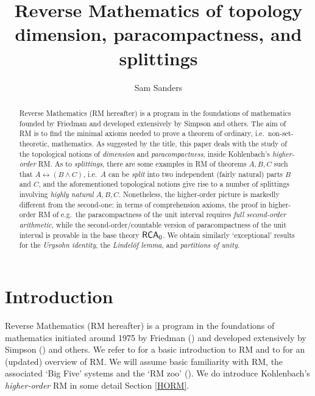 \documentclass[reqno]{amsart}
\def\RCA{\textup{\textsf{RCA}}}
\def\asa{\leftrightarrow}
\numberwithin{equation}{section}
\numberwithin{thm}{section}
\begin{document}
\title[Reverse Mathematics of topology]{Reverse Mathematics of topology \\ {\tiny dimension, paracompactness, and splittings}}
\author{Sam Sanders}
\address{Centre for Advanced Studies, LMU Munich \& Department of Mathematics, TU Darmstadt, Germany}

\begin{abstract}
Reverse Mathematics (RM hereafter) is a program in the foundations of mathematics founded by Friedman and developed extensively by Simpson and others.  
The aim of RM is to find the minimal axioms needed to prove a theorem of ordinary, i.e.\ non-set-theoretic, mathematics.  As suggested by the title, 
this paper deals with the study of the topological notions of \emph{dimension} and \emph{paracompactness}, inside Kohlenbach's \emph{higher-order} RM. 
As to \emph{splittings}, there are some examples in RM of theorems $A, B, C$ such that $A\asa (B\wedge C)$, i.e.\ $A$ can be \emph{split} into two independent (fairly natural) parts $B$ and $C$, and the aforementioned topological notions give rise to a number of splittings involving \emph{highly natural} $A, B, C$.  
Nonetheless, the higher-order picture is markedly different from the second-one: in terms of comprehension axioms, the proof in higher-order RM of e.g.\ the paracompactness of the unit interval requires \emph{full second-order arithmetic}, while the second-order/countable version of paracompactness of the unit interval is provable in the base theory $\RCA_{0}$. 
We obtain similarly `exceptional' results for the \emph{Urysohn identity}, the \emph{Lindel\"of lemma}, and \emph{partitions of unity}.   
\end{abstract}
%

\newpage
\maketitle
\thispagestyle{empty}


\section{Introduction}\label{intro}
Reverse Mathematics (RM hereafter) is a program in the foundations of mathematics initiated around 1975 by Friedman (\cites{fried,fried2}) and developed extensively by Simpson (\cite{simpson2}) and others.  
We refer to \cite{stillebron} for a basic introduction to RM and to \cite{simpson2, simpson1} for an (updated) overview of RM.  We will assume basic familiarity with RM, the associated `Big Five' systems and the `RM zoo' (\cite{damirzoo}).  
We do introduce Kohlenbach's \emph{higher-order} RM in some detail Section \ref{HORM}.    
\end{document}

